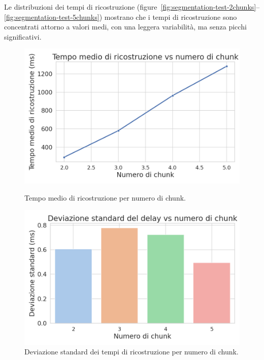 \documentclass[12pt,a4paper,twoside]{book}
\begin{document}
Le distribuzioni dei tempi di ricostruzione (figure~\ref{fig:segmentation-test-2chunks}–\ref{fig:segmentation-test-5chunks})
mostrano che i tempi di ricostruzione sono concentrati attorno a valori medi, con una
leggera variabilità, ma senza picchi significativi.
\newpage
\begin{figure}[H]
    \centering
    \begin{minipage}{0.47\textwidth}
        \centering
        \includegraphics[width=\textwidth]{img/tests/T2/T2-avg-time.png}
        \caption{Tempo medio di ricostruzione per numero di chunk.}
        \label{fig:segmentation-reconstruction-avg-time}
    \end{minipage}
    \hfill
    \begin{minipage}{0.47\textwidth}
        \centering
        \includegraphics[width=\textwidth]{img/tests/T2/T2-sd.png}
        \caption{Deviazione standard dei tempi di ricostruzione per numero di chunk.}
        \label{fig:segmentation-reconstruction-sd}
    \end{minipage}
\end{figure}
\end{document}
